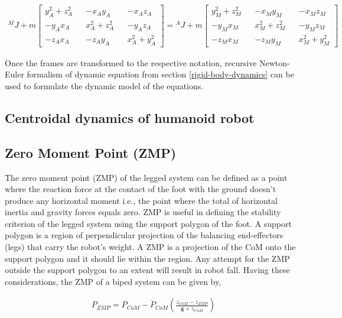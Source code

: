 \begin{align}
    \label{eq: translation-frame}
        {^M}J + m \begin{bmatrix}
            y^2_A + z^2_A && -x_Ay_A && -x_Az_A \\
            -y_Ax_A && x^2_A + z^2_A && -y_Az_A \\
            -z_Ax_A && -z_Ay_A && x^2_A+y^2_A
        \end{bmatrix} = {^A}J + m \begin{bmatrix}
            y^2_M + z^2_M && -x_My_M && -x_Mz_M \\
            -y_Mx_M && x^2_M + z^2_M && -y_Mz_M \\
            -z_Mx_M && -z_My_M && x^2_M+y^2_M
        \end{bmatrix}
\end{align}


Once the frames are transformed to the respective notation, recursive Newton-Euler formalism of dynamic equation from section \ref{rigid-body-dynamics}
can be used to formulate the dynamic model of the equations.

\subsection{Centroidal dynamics of humanoid robot}

\subsection{Zero Moment Point (ZMP)}

The zero moment point (ZMP) of the legged system can be defined as a point where the reaction force at the contact 
of the foot with the ground doesn't produce any horizontal moment i.e., the point where the total of horizontal inertia and
gravity forces equals zero. ZMP is useful in defining the stability criterion of the legged system using the support polygon of 
the foot. A support polygon is a region of perpendicular projection of the balancing end-effectors (legs) that carry the robot's weight.
A ZMP is a projection of the CoM onto the support polygon and it should lie within the region. Any attempt for the ZMP 
outside the support polygon to an extent will result in robot fall. Having these considerations, the ZMP of a biped system
can be given by,

\begin{equation}
    \begin{split}
        P_{ZMP} = P_{CoM} - \ddot{P}_{CoM}(\frac{z_{CoM} - z_{ZMP}}{\mathbf{g} + \ddot{z}_{CoM}})
    \end{split}
\end{equation}

